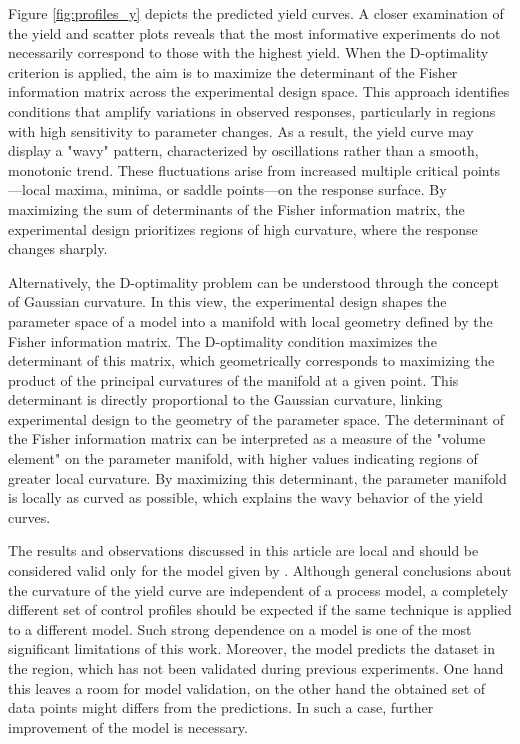 \documentclass[../Article_Sensitivity_Analsysis.tex]{subfiles}
\begin{document}
	Figure \ref{fig:profiles_y} depicts the predicted yield curves. A closer examination of the yield and scatter plots reveals that the most informative experiments do not necessarily correspond to those with the highest yield. When the D-optimality criterion is applied, the aim is to maximize the determinant of the Fisher information matrix across the experimental design space. This approach identifies conditions that amplify variations in observed responses, particularly in regions with high sensitivity to parameter changes. As a result, the yield curve may display a "wavy" pattern, characterized by oscillations rather than a smooth, monotonic trend. These fluctuations arise from increased multiple critical points—local maxima, minima, or saddle points—on the response surface. By maximizing the sum of determinants of the Fisher information matrix, the experimental design prioritizes regions of high curvature, where the response changes sharply. 
	
	Alternatively, the D-optimality problem can be understood through the concept of Gaussian curvature. In this view, the experimental design shapes the parameter space of a model into a manifold with local geometry defined by the Fisher information matrix. The D-optimality condition maximizes the determinant of this matrix, which geometrically corresponds to maximizing the product of the principal curvatures of the manifold at a given point. This determinant is directly proportional to the Gaussian curvature, linking experimental design to the geometry of the parameter space. The determinant of the Fisher information matrix can be interpreted as a measure of the "volume element" on the parameter manifold, with higher values indicating regions of greater local curvature. By maximizing this determinant, the parameter manifold is locally as curved as possible, which explains the wavy behavior of the yield curves.
	
	The results and observations discussed in this article are local and should be considered valid only for the model given by \citet{Sliczniuk2024}. Although general conclusions about the curvature of the yield curve are independent of a process model, a completely different set of control profiles should be expected if the same technique is applied to a different model. Such strong dependence on a model is one of the most significant limitations of this work. Moreover, the model predicts the dataset in the region, which has not been validated during previous experiments. One hand this leaves a room for model validation, on the other hand the obtained set of data points might differs from the predictions. In such a case, further improvement of the model is necessary.
	
\end{document}
